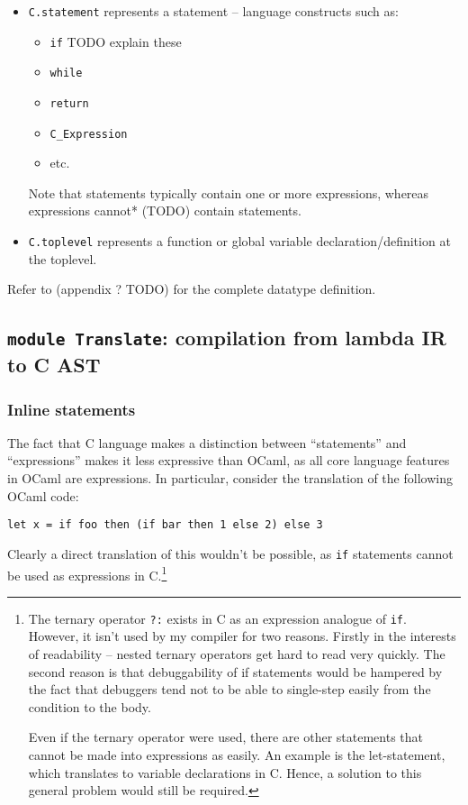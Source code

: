 \documentclass[12pt,a4paper,twoside,openright]{report}
\begin{document}
\begin{itemize}
	\item
		\lstinline!C.statement! represents a statement -- language constructs such as:
        
        \begin{itemize}
            \item \lstinline!if! TODO explain these
            \item \lstinline!while!
            \item \lstinline!return!
            \item \lstinline!C_Expression!
            \item etc.
        \end{itemize}
        Note that statements typically contain one or more expressions, whereas expressions cannot* (TODO) contain statements.

	\item
		\lstinline!C.toplevel! represents a function or global variable declaration/definition at the toplevel.
\end{itemize}

Refer to (appendix ? TODO) for the complete datatype definition.

\subsection{\texttt{module Translate}: compilation from lambda IR to C AST}

\subsubsection{Inline statements}

The fact that C language makes a distinction between ``statements'' and
``expressions'' makes it less expressive than OCaml, as all core language
features in OCaml are expressions. In particular, consider the translation of
the following OCaml code:

\begin{lstlisting}
let x = if foo then (if bar then 1 else 2) else 3
\end{lstlisting}

Clearly a direct translation of this wouldn't be possible, as \lstinline!if!
statements cannot be used as expressions in C.\footnote{
    The ternary operator \lstinline!?:! exists in C as an expression analogue
    of \lstinline!if!.  However, it isn't used by my compiler for two reasons.
    Firstly in the interests of readability -- nested ternary operators get
    hard to read very quickly. The second reason is that debuggability of if
    statements would be hampered by the fact that debuggers tend not to be able
    to single-step easily from the condition to the body.

    Even if the ternary operator were used, there are other statements that
    cannot be made into expressions as easily. An example is the let-statement,
    which translates to variable declarations in C. Hence, a solution to this
    general problem would still be required.}
\end{document}
